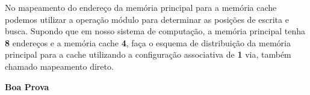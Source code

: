 \documentclass[11pt,a4paper]{article}
\begin{document}
No mapeamento do endereço da memória principal para a memória
cache podemos utilizar a operação módulo para determinar as posições
de escrita e busca. Supondo que em nosso sistema de computação, a
memória principal tenha {\bf 8} endereços e a memória cache {\bf 4},
faça o esquema de distribuição da memória principal para a cache
utilizando a configuração associativa de {\bf 1} via, também chamado 
mapeamento direto.

\vfill

\begin{flushright}
\bf\large  Boa Prova
\end{flushright}
\end{document}
